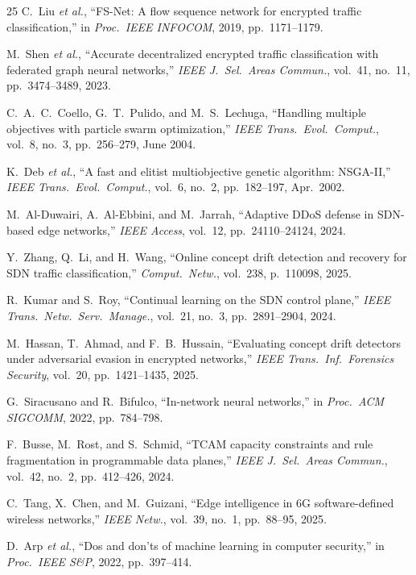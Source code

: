 \documentclass[journal]{IEEEtran}
\begin{document}
\begin{thebibliography}{25}
C.~Liu \textit{et al.}, ``FS-Net: A flow sequence network for encrypted
traffic classification,'' in \textit{Proc.\ IEEE INFOCOM}, 2019,
pp.~1171--1179.

M.~Shen \textit{et al.}, ``Accurate decentralized encrypted traffic
classification with federated graph neural networks,''
\textit{IEEE J.\ Sel.\ Areas Commun.}, vol.~41, no.~11, pp.~3474--3489, 2023.

C.~A.~C.~Coello, G.~T.~Pulido, and M.~S.~Lechuga, ``Handling multiple
objectives with particle swarm optimization,''
\textit{IEEE Trans.\ Evol.\ Comput.}, vol.~8, no.~3, pp.~256--279, June 2004.

K.~Deb \textit{et al.}, ``A fast and elitist multiobjective genetic algorithm:
NSGA-II,'' \textit{IEEE Trans.\ Evol.\ Comput.}, vol.~6, no.~2,
pp.~182--197, Apr.\ 2002.

M.~Al-Duwairi, A.~Al-Ebbini, and M.~Jarrah,
``Adaptive DDoS defense in SDN-based edge networks,''
\textit{IEEE Access}, vol.~12, pp.~24110--24124, 2024.

Y.~Zhang, Q.~Li, and H.~Wang,
``Online concept drift detection and recovery for SDN traffic classification,''
\textit{Comput.\ Netw.}, vol.~238, p.~110098, 2025.

R.~Kumar and S.~Roy,
``Continual learning on the SDN control plane,''
\textit{IEEE Trans.\ Netw.\ Serv.\ Manage.}, vol.~21, no.~3,
pp.~2891--2904, 2024.

M.~Hassan, T.~Ahmad, and F.~B.~Hussain,
``Evaluating concept drift detectors under adversarial evasion in encrypted
networks,''
\textit{IEEE Trans.\ Inf.\ Forensics Security}, vol.~20, pp.~1421--1435, 2025.

G.~Siracusano and R.~Bifulco, ``In-network neural networks,''
in \textit{Proc.\ ACM SIGCOMM}, 2022, pp.~784--798.

F.~Busse, M.~Rost, and S.~Schmid,
``TCAM capacity constraints and rule fragmentation in programmable data planes,''
\textit{IEEE J.\ Sel.\ Areas Commun.}, vol.~42, no.~2, pp.~412--426, 2024.

C.~Tang, X.~Chen, and M.~Guizani,
``Edge intelligence in 6G software-defined wireless networks,''
\textit{IEEE Netw.}, vol.~39, no.~1, pp.~88--95, 2025.

D.~Arp \textit{et al.}, ``Dos and don'ts of machine learning in computer
security,'' in \textit{Proc.\ IEEE S\&P}, 2022, pp.~397--414.


\end{thebibliography}
\end{document}
